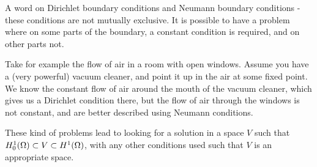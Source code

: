A word on Dirichlet boundary conditions and Neumann boundary 
conditions - these conditions are not mutually exclusive.
It is possible to have a problem where on some parts of the boundary, 
a constant condition is required, and on other parts not.

Take for example the flow of air in a room with open windows. 
Assume you have a (very powerful) vacuum cleaner,
 and point it up in the air at some fixed point. 
We know the constant flow of air around the mouth of the vacuum cleaner, which 
gives us a Dirichlet condition there, but the flow of air through the 
windows is not constant, and are better described using Neumann conditions.

These kind of problems lead to looking for a solution in a space $V$ such that 
$H^1_0(\Omega) \subset V \subset H^1(\Omega)$, with any other conditions used such 
that $V$ is an appropriate space.